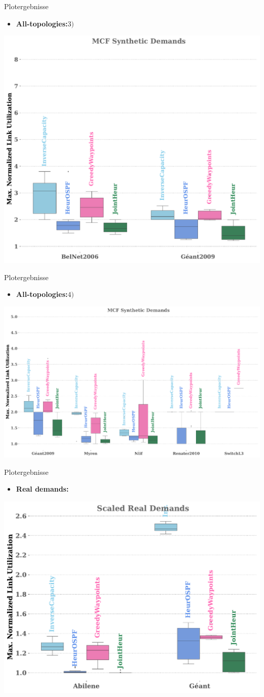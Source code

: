 \documentclass[aspectratio=169,10pt]{beamer}
\begin{document}
\begin{frame}[fragile]{Plotergebnisse}
\begin{itemize}
    \item \textbf{All-topologies:}\newline $3)$
\end{itemize}
\begin{center}
    \includegraphics[width=.5\textwidth]{images/naveed_2.pdf}
\end{center}
\end{frame}
\begin{frame}[fragile]{Plotergebnisse}
\begin{itemize}
    \item \textbf{All-topologies:}\newline $4)$
\end{itemize}
\begin{center}
    \includegraphics[width=.7\textwidth]{images/naveed_5.pdf}
\end{center}
\end{frame}
\begin{frame}[fragile]{Plotergebnisse}
\begin{itemize}
    \item \textbf{Real demands:}
\end{itemize}
\begin{center}
    \includegraphics[width=.6\textwidth]{images/naveed_6.pdf}
\end{center}
\end{frame}
\end{document}
